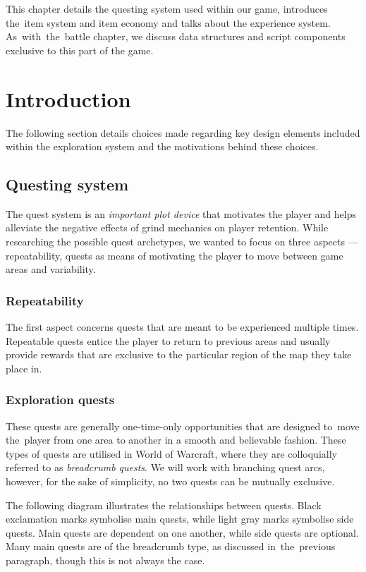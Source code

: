 \documentclass[thesis=B,english,hidelinks]{FITthesisXE}[2012/06/26]
\begin{document}
This chapter details the questing system used within our game, introduces the~item system and item economy and talks about the experience system. As~with~the~battle chapter, we discuss data structures and script components exclusive to this part of the game.

\section{Introduction}

The following section details choices made regarding key design elements included within the exploration system and the motivations behind these choices.

\subsection{Questing system}

The quest system is an \emph{important plot device} that motivates the player and helps alleviate the negative effects of grind mechanics on player retention. While researching the possible quest archetypes, we wanted to focus on three aspects --- repeatability, quests as means of motivating the player to move between game areas and variability.

\subsubsection{Repeatability}

The first aspect concerns quests that are meant to be experienced multiple times. Repeatable quests entice the player to return to previous areas and usually provide rewards that are exclusive to the particular region of the map they take place in.

\subsubsection{Exploration quests}

These quests are generally one-time-only opportunities that are designed to~move the~player from one area to another in a smooth and believable fashion. These types of quests are utilised in World of Warcraft, where they are colloquially referred to as \emph{breadcrumb quests}. We will work with branching quest arcs, however, for the sake of simplicity, no two quests can be mutually exclusive.

The following diagram illustrates the relationships between quests. Black exclamation marks symbolise main quests, while light gray marks symbolise side quests. Main quests are dependent on one another, while side quests are optional. Many main quests are of the breadcrumb type, as discussed in~the~previous paragraph, though this is not always the case.
\end{document}
